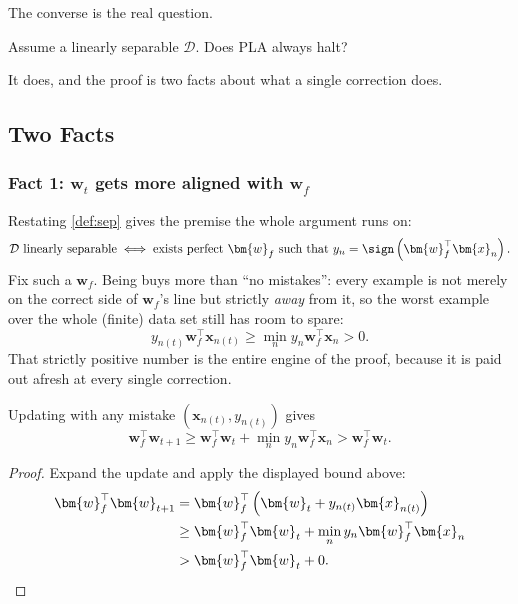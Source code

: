 The converse is the real question.

\begin{question}
    Assume a linearly separable \(\mathcal{D}\). Does PLA always halt?
\end{question}

It does, and the proof is two facts about what a single correction does.

\subsection{Two Facts}

\subsubsection*{Fact 1: \texorpdfstring{\(\bm{w}_t\)}{w\_t} gets more aligned
with \texorpdfstring{\(\bm{w}_f\)}{w\_f}}

Restating \autoref{def:sep} gives the premise the whole argument runs on:
\[
    \mathcal{D} \text{ linearly separable}
    \iff
    \text{exists perfect } \bm{w}_f \text{ such that }
    y_n = \sign \left( \bm{w}_f^\top \bm{x}_n \right) .
\]
Fix such a \(\bm{w}_f\). Being  buys more than ``no mistakes'':
every example is not merely on the correct side of \(\bm{w}_f\)'s line but
strictly \emph{away} from it, so the worst example over the whole (finite) data
set still has room to spare:
\[
    y_{n(t)} \bm{w}_f^\top \bm{x}_{n(t)}
    \ge \min_n y_n \bm{w}_f^\top \bm{x}_n > 0 .
\]
That strictly positive number is the entire engine of the proof, because it is
paid out afresh at every single correction.

\begin{lemma}\label{lem:align}
    Updating with any mistake \((\bm{x}_{n(t)}, y_{n(t)})\) gives
    \[
        \bm{w}_f^\top \bm{w}_{t+1}
        \ge \bm{w}_f^\top \bm{w}_t + \min_n y_n \bm{w}_f^\top \bm{x}_n
        > \bm{w}_f^\top \bm{w}_t .
    \]
\end{lemma}

\begin{proof}
    Expand the update and apply the displayed bound above:
    \begin{align*}
        \bm{w}_f^\top \bm{w}_{t+1}
        &= \bm{w}_f^\top \left( \bm{w}_t + y_{n(t)} \bm{x}_{n(t)} \right)\\
        &\ge \bm{w}_f^\top \bm{w}_t + \min_n y_n \bm{w}_f^\top \bm{x}_n\\
        &> \bm{w}_f^\top \bm{w}_t + 0 . \qedhere
    \end{align*}
\end{proof}

